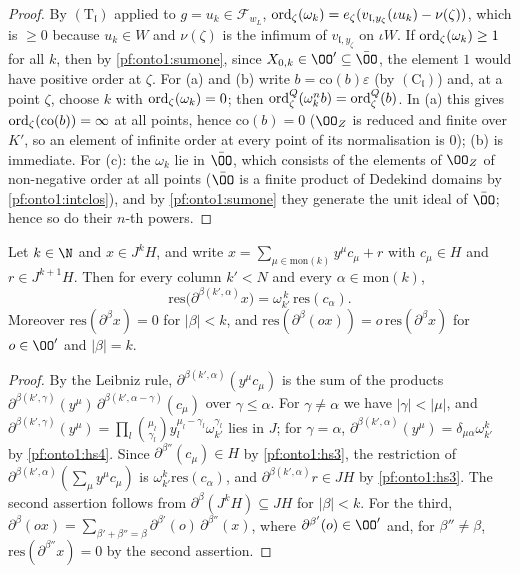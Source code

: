 \begin{proof}
By $(\mathrm T_{\mathfrak l})$ applied to $g=u_k\in\mathcal F_{w_L}$, $\operatorname{ord}_\zeta(\omega_k)=e_\zeta(v_{\mathfrak l,y_\zeta}(\iota u_k)-\nu(\zeta))$,
which is $\ge0$ because $u_k\in W$ and $\nu(\zeta)$ is the infimum of $v_{\mathfrak l,y_\zeta}$ on $\iota W$. If
$\operatorname{ord}_\zeta(\omega_k)\ge1$ for all $k$, then by \eqref{pf:onto1:sumone}, since $X_{0,k}\in\OO'\subseteq\bar\OO$, the element $1$
would have positive order at $\zeta$. For (a) and (b) write $b=\mathrm{co}(b)\varepsilon$ (by $(\mathrm C_{\mathfrak l})$) and, at a
point $\zeta$, choose $k$ with $\operatorname{ord}_\zeta(\omega_k)=0$; then $\operatorname{ord}^Q_\zeta(\omega_k^nb)=\operatorname{ord}^Q_\zeta(b)$. In (a) this
gives $\operatorname{ord}_\zeta(\mathrm{co}(b))=\infty$ at all points, hence $\mathrm{co}(b)=0$ ($\OO_Z$ is reduced and finite over $K'$, so
an element of infinite order at every point of its normalisation is $0$); (b) is immediate. For (c): the $\omega_k$ lie in
$\bar\OO$, which consists of the elements of $\OO_Z$ of non-negative order at all points ($\bar\OO$ is a finite product of
Dedekind domains by \cref{pf:onto1:intclos}), and by \eqref{pf:onto1:sumone} they generate the unit ideal of $\bar\OO$; hence so do
their $n$-th powers.
\end{proof}

\begin{lemma}\label{pf:onto1:taylor}
Let $k\in\N$ and $x\in J^kH$, and write $x=\sum_{\mu\in\mathrm{mon}(k)}y^\mu c_\mu+r$ with $c_\mu\in H$ and $r\in J^{k+1}H$. Then
for every column $k'<N$ and every $\alpha\in\mathrm{mon}(k)$,
\[
\mathrm{res}\bigl(\partial^{\beta(k',\alpha)}x\bigr)=\omega_{k'}^{\,k}\,\mathrm{res}(c_\alpha).
\]
Moreover $\mathrm{res}(\partial^\beta x)=0$ for $|\beta|<k$, and $\mathrm{res}(\partial^\beta(ox))=o\,\mathrm{res}(\partial^\beta x)$ for $o\in\OO'$
and $|\beta|=k$.
\end{lemma}

\begin{proof}
By the Leibniz rule, $\partial^{\beta(k',\alpha)}(y^\mu c_\mu)$ is the sum of the products $\partial^{\beta(k',\gamma)}(y^\mu)\,
\partial^{\beta(k',\alpha-\gamma)}(c_\mu)$ over $\gamma\le\alpha$. For $\gamma\ne\alpha$ we have $|\gamma|<|\mu|$, and
$\partial^{\beta(k',\gamma)}(y^\mu)=\prod_l\binom{\mu_l}{\gamma_l}y_l^{\mu_l-\gamma_l}\omega_{k'}^{\gamma_l}$ lies in $J$; for $\gamma=\alpha$,
$\partial^{\beta(k',\alpha)}(y^\mu)=\delta_{\mu\alpha}\omega_{k'}^k$ by \ref{pf:onto1:hs4}. Since $\partial^{\beta''}(c_\mu)\in H$ by
\ref{pf:onto1:hs3}, the restriction of $\partial^{\beta(k',\alpha)}(\sum_\mu y^\mu c_\mu)$ is $\omega_{k'}^k\mathrm{res}(c_\alpha)$, and
$\partial^{\beta(k',\alpha)}r\in JH$ by \ref{pf:onto1:hs3}. The second assertion follows from $\partial^\beta(J^kH)\subseteq JH$
for $|\beta|<k$. For the third, $\partial^\beta(ox)=\sum_{\beta'+\beta''=\beta}\partial^{\beta'}(o)\,\partial^{\beta''}(x)$, where
$\partial^{\beta'}(o)\in\OO'$ and, for $\beta''\ne\beta$, $\mathrm{res}(\partial^{\beta''}x)=0$ by the second assertion.
\end{proof}

